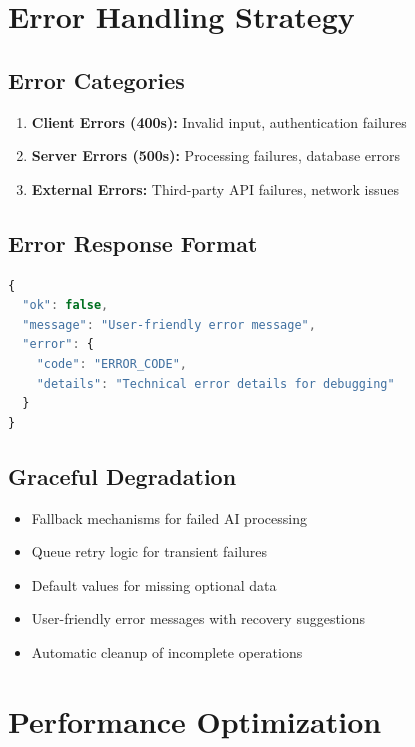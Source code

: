 \section{Error Handling Strategy}

\subsection{Error Categories}

\begin{enumerate}
    \item \textbf{Client Errors (400s):} Invalid input, authentication failures
    \item \textbf{Server Errors (500s):} Processing failures, database errors
    \item \textbf{External Errors:} Third-party API failures, network issues
\end{enumerate}

\subsection{Error Response Format}

\begin{lstlisting}[language=JavaScript, caption=Standard Error Response]
{
  "ok": false,
  "message": "User-friendly error message",
  "error": {
    "code": "ERROR_CODE",
    "details": "Technical error details for debugging"
  }
}
\end{lstlisting}

\subsection{Graceful Degradation}

\begin{itemize}
    \item Fallback mechanisms for failed AI processing
    \item Queue retry logic for transient failures
    \item Default values for missing optional data
    \item User-friendly error messages with recovery suggestions
    \item Automatic cleanup of incomplete operations
\end{itemize}

\section{Performance Optimization}

